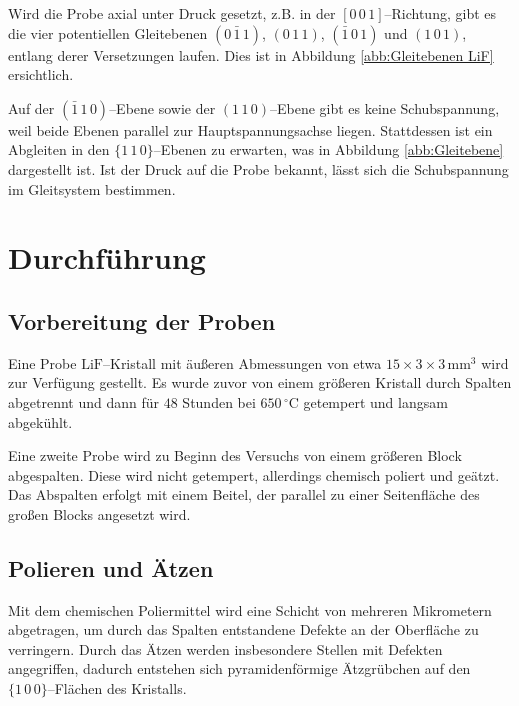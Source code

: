 \documentclass[12pt,a4paper]{scrartcl}
\numberwithin{equation}{section} %
\begin{document}
Wird die Probe axial unter Druck gesetzt, z.B. in der $[0\,0\,1]$--Richtung, gibt es die vier potentiellen Gleitebenen $(0\,\bar{1}\,1)$, $(0\,1\,1)$, $(\bar{1}\,0\,1)$ und $(1\,0\,1)$, entlang derer Versetzungen laufen. Dies ist in Abbildung \ref{abb:Gleitebenen LiF} ersichtlich.

Auf der $(\bar{1}\,1\,0)$--Ebene sowie der $(1\,1\,0)$--Ebene gibt es keine Schubspannung, weil beide Ebenen parallel zur Hauptspannungsachse liegen. Stattdessen ist ein Abgleiten in den $\lbrace1\,1\,0\rbrace$--Ebenen zu erwarten, was in Abbildung \ref{abb:Gleitebene} dargestellt ist. Ist der Druck auf die Probe bekannt, lässt sich die Schubspannung im Gleitsystem bestimmen.

\clearpage
\hypertarget{durchfuxfchrung}{%
\section{Durchführung}\label{durchfuxfchrung}}

\hypertarget{vorbereitung-der-proben}{%
\subsection{Vorbereitung der Proben}\label{vorbereitung-der-proben}}

Eine Probe $\mathrm{LiF}$--Kristall mit äußeren Abmessungen von etwa $15 \times 3 \times 3 \,\mathrm{mm^3}$ wird zur Verfügung gestellt. Es wurde zuvor von einem größeren Kristall durch Spalten abgetrennt und dann für $48$ Stunden bei $650\,^\circ\mathrm C$ getempert und langsam abgekühlt.

Eine zweite Probe wird zu Beginn des Versuchs von einem größeren Block abgespalten. Diese wird nicht getempert, allerdings chemisch poliert und geätzt. Das Abspalten erfolgt mit einem Beitel, der parallel zu einer Seitenfläche des großen Blocks angesetzt wird.

\hypertarget{polieren-und-uxe4tzen}{%
\subsection{Polieren und Ätzen}\label{polieren-und-uxe4tzen}}

Mit dem chemischen Poliermittel wird eine Schicht von mehreren Mikrometern abgetragen, um durch das Spalten entstandene Defekte an der Oberfläche zu verringern. Durch das Ätzen werden insbesondere Stellen mit Defekten angegriffen, dadurch entstehen sich pyramidenförmige Ätzgrübchen auf den $\{1\,0\,0\}$--Flächen des Kristalls.
\end{document}
